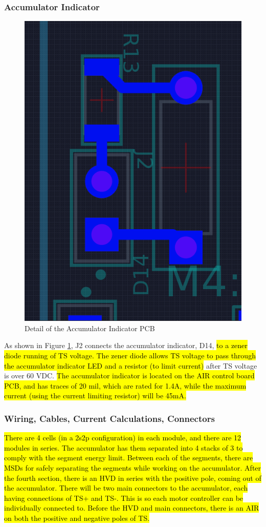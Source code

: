 \documentclass{article}
\DeclareRobustCommand{\hlr}[1]{{\sethlcolor{red}\hl{#1}}}
\begin{document}
        \subsubsection{Accumulator Indicator} \label{aindicator}


            \begin{figure}[H]
            \centering
            \includegraphics[width = 0.3 \textwidth]{ai}
            \caption{Detail of the Accumulator Indicator PCB}
            \label{indicator}
            \end{figure}

            As shown in Figure \ref{indicator}, J2 connects the accumulator indicator, D14, \hlr{to a zener diode running of TS voltage. The zener diode allows TS voltage to pass through the accumulator indicator LED and a resistor (to limit current)} after TS voltage is over 60 VDC. \hlr{The accumulator indicator is located on the AIR control board PCB, and has traces of 20 mil, which are rated for 1.4A, while the maximum current (using the current limiting resistor) will be 45mA. }

        \subsubsection{Wiring, Cables, Current Calculations, Connectors} \label{batteryconnectors}

            \hlr{There are 4 cells (in a 2s2p configuration) in each module, and there are 12 modules in series. The accumulator has them separated into 4 stacks of 3 to comply with the segment energy limit. Between each of the segments, there are MSDs for safely separating the segments while working on the accumulator. After the fourth section, there is an HVD in series with the positive pole, coming out of the accumulator. There will be two main connectors to the accumulator, each having connections of TS+ and TS-. This is so each motor controller can be individually connected to. Before the HVD and main connectors, there is an AIR on both the positive and negative poles of TS. }
\end{document}
